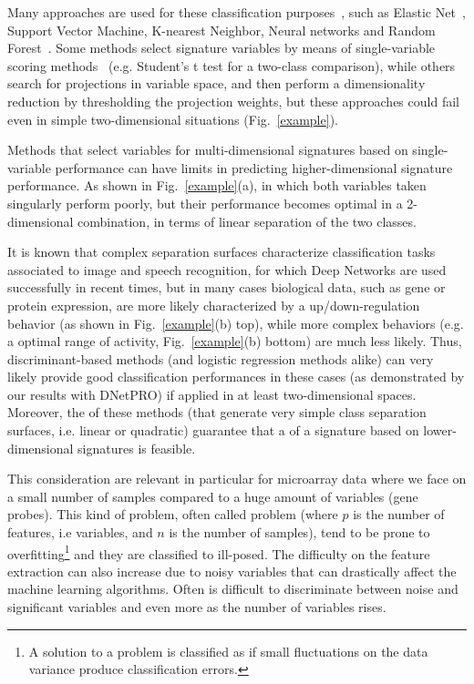\documentclass{standalone}
\begin{document}
Many approaches are used for these classification purposes~\cite{Guyon2002}, such as Elastic Net~\cite{Hughey2015}, Support Vector Machine, K-nearest Neighbor, Neural networks and Random Forest~\cite{Pang2012}.
Some methods select signature variables by means of single-variable scoring methods~\cite{Eckhard2012, Hocking1976} (e.g. Student's t test for a two-class comparison), while others search for projections in variable space, and then perform a dimensionality reduction by thresholding the projection weights, but these approaches could fail even in simple two-dimensional situations (Fig.~\ref{example}).

Methods that select variables for multi-dimensional signatures based on single-variable performance can have limits in predicting higher-dimensional signature performance.
As shown in Fig.~\ref{example}(a), in which both variables taken singularly perform poorly, but their performance becomes optimal in a 2-dimensional combination, in terms of linear separation of the two classes.

It is known that complex separation surfaces characterize classification tasks associated to image and speech recognition, for which Deep Networks are used successfully in recent times, but in many cases biological data, such as gene or protein expression, are more likely characterized by a up/down-regulation behavior (as shown in Fig.~\ref{example}(b) top), while more complex behaviors (e.g. a  optimal range of activity, Fig.~\ref{example}(b) bottom) are much less likely.
Thus, discriminant-based methods (and logistic regression methods alike) can very likely provide good classification performances in these cases (as demonstrated by our results with DNetPRO) if applied in at least two-dimensional spaces.
Moreover, the  of these methods (that generate very simple class separation surfaces, i.e. linear or quadratic) guarantee that a  of a signature based on lower-dimensional signatures is feasible.

This consideration are relevant in particular for microarray data where we face on a small number of samples compared to a huge amount of variables (gene probes).
This kind of problem, often called  problem (where $p$ is the number of features, i.e variables, and $n$ is the number of samples), tend to be prone to overfitting\footnote{A solution to a problem is classified as  if small fluctuations on the data variance produce classification errors.} and they are classified to ill-posed.
The difficulty on the feature extraction can also increase due to noisy variables that can drastically affect the machine learning algorithms.
Often is difficult to discriminate between noise and significant variables and even more as the number of variables rises.
\end{document}
